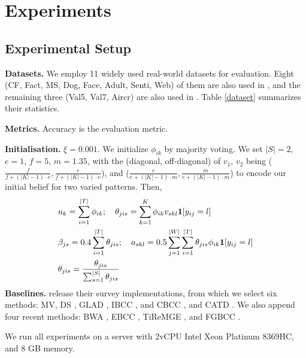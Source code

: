 \documentclass[letterpaper]{article} %
\begin{document}
\section{Experiments}
\subsection{Experimental Setup}
\textbf{Datasets.} We employ 11 widely used real-world datasets for evaluation. Eight (CF, Fact, MS, Dog, Face, Adult, Senti, Web) of them are also used in \citet{Lietal2019b}, and the remaining three (Val5, Val7, Aircr) are also used in \citet{Wuetal2022}. Table \ref{dataset} summarizes their statistics.

\noindent
\textbf{Metrics.} Accuracy is the evaluation metric.

\noindent
\textbf{Initialisation.} $\xi=0.001$. We initialize $\phi_{ik}$ by majority voting. We set $|S|=2$, $e=1$, $f=5$, $m=1.35$, with the (diagonal, off-diagonal) of $v_{1}$, $v_{2}$ being ($\frac{f}{f+(|K|-1)\cdot e}, \frac{e}{f+(|K|-1)\cdot e}$), and ($\frac{e}{e+(|K|-1)\cdot m}, \frac{m}{e+(|K|-1)\cdot m}$) to encode our initial belief for two varied patterns. Then,
\begin{align}
  &u_{k}=\sum_{i=1}^{|T|}\phi_{ik};\quad\theta_{jis}=\sum_{k=1}^{K}\phi_{ik}v_{skl}\mathbf{1}[y_{ij}=l] \notag\\
  &\beta_{js}=0.4\sum_{i=1}^{|T|}\theta_{jis};\quad a_{skl}=0.5\sum_{j=1}^{|W|}\sum_{i=1}^{|T|}\theta_{jis}\phi_{ik}\mathbf{1}[y_{ij}=l] \notag\\
  &\theta_{jis}=\frac{\theta_{jis}}{\sum_{s=1}^{|S|}\theta_{jis}} \notag
\end{align}
\textbf{Baselines.} \citet{Zhengetal2017} release their survey implementations, from which we select six methods: MV, DS \cite{DawidSkene1979}, GLAD \cite{Whitehilletal2009}, IBCC \cite{KimGhahramani2012}, and CBCC \cite{Venanzietal2014}, and CATD \cite{Lietal2014}. We also append four recent methods: BWA \cite{Lietal2019b}, EBCC \cite{Lietal2019a}, TiReMGE \cite{Wuetal2023}, and FGBCC \cite{Chenetal25}.

We run all experiments on a server with 2vCPU Intel Xeon Platinum 8369HC, and 8 GB memory.
\end{document}
